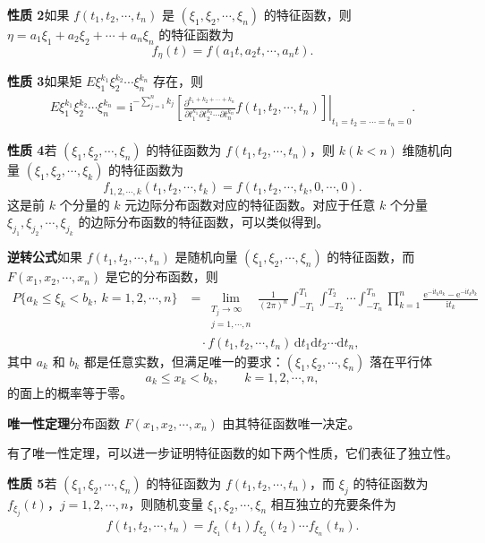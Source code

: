 \documentclass[../../main.tex]{subfiles}
\begin{document}
\noindent\textbf{性质 2}\quad 如果 $f(t_1,t_2,\cdots,t_n)$ 是 $(\xi_1,\xi_2,\cdots,\xi_n)$ 的特征函数，则 $\eta=a_1\xi_1+a_2\xi_2+\cdots+a_n\xi_n$ 的特征函数为
\[
f_\eta(t)=f(a_1 t,a_2 t,\cdots,a_n t).
\]

\noindent\textbf{性质 3}\quad 如果矩 $E\xi_1^{k_1}\xi_2^{k_2}\cdots\xi_n^{k_n}$ 存在，则
\begin{align}
E\xi_1^{k_1}\xi_2^{k_2}\cdots\xi_n^{k_n}
=\mathrm{i}^{-\sum_{j=1}^n k_j}\left.\left[\frac{\partial^{k_1+k_2+\cdots+k_n}}{\partial t_1^{k_1}\partial t_2^{k_2}\cdots\partial t_n^{k_n}}f(t_1,t_2,\cdots,t_n)\right]\right|_{t_1=t_2=\cdots=t_n=0}.\label{align:ch04-多元矩}
\end{align}

\noindent\textbf{性质 4}\quad 若 $(\xi_1,\xi_2,\cdots,\xi_n)$ 的特征函数为 $f(t_1,t_2,\cdots,t_n)$，则 $k(k<n)$ 维随机向量 $(\xi_1,\xi_2,\cdots,\xi_k)$ 的特征函数为
\[
f_{1,2,\cdots,k}(t_1,t_2,\cdots,t_k)=f(t_1,t_2,\cdots,t_k,0,\cdots,0).
\]
这是前 $k$ 个分量的 $k$ 元边际分布函数对应的特征函数。对应于任意 $k$ 个分量 $\xi_{j_1},\xi_{j_2},\cdots,\xi_{j_k}$ 的边际分布函数的特征函数，可以类似得到。

\noindent\textbf{逆转公式}\quad 如果 $f(t_1,t_2,\cdots,t_n)$ 是随机向量 $(\xi_1,\xi_2,\cdots,\xi_n)$ 的特征函数，而 $F(x_1,x_2,\cdots,x_n)$ 是它的分布函数，则
\begin{align*}
P\{a_k\leqslant\xi_k<b_k,\ k=1,2,\cdots,n\}
&=\lim_{\substack{T_j\to\infty\\j=1,\cdots,n}}\frac{1}{(2\pi)^n}\int_{-T_1}^{T_1}\int_{-T_2}^{T_2}\cdots\int_{-T_n}^{T_n}\prod_{k=1}^n\frac{\mathrm{e}^{-\mathrm{i}t_k a_k}-\mathrm{e}^{-\mathrm{i}t_k b_k}}{\mathrm{i}t_k}\\
&\quad\cdot f(t_1,t_2,\cdots,t_n)\,\mathrm{d}t_1\mathrm{d}t_2\cdots\mathrm{d}t_n,
\end{align*}
其中 $a_k$ 和 $b_k$ 都是任意实数，但满足唯一的要求：$(\xi_1,\xi_2,\cdots,\xi_n)$ 落在平行体
\[
a_k\leqslant x_k<b_k,\qquad k=1,2,\cdots,n,
\]
的面上的概率等于零。

\noindent\textbf{唯一性定理}\quad 分布函数 $F(x_1,x_2,\cdots,x_n)$ 由其特征函数唯一决定。

有了唯一性定理，可以进一步证明特征函数的如下两个性质，它们表征了独立性。

\noindent\textbf{性质 5}\quad 若 $(\xi_1,\xi_2,\cdots,\xi_n)$ 的特征函数为 $f(t_1,t_2,\cdots,t_n)$，而 $\xi_j$ 的特征函数为 $f_{\xi_j}(t)$，$j=1,2,\cdots,n$，则随机变量 $\xi_1,\xi_2,\cdots,\xi_n$ 相互独立的充要条件为
\begin{align}
f(t_1,t_2,\cdots,t_n)=f_{\xi_1}(t_1)f_{\xi_2}(t_2)\cdots f_{\xi_n}(t_n).\label{align:ch04-独立乘积特征函数}
\end{align}
\end{document}
